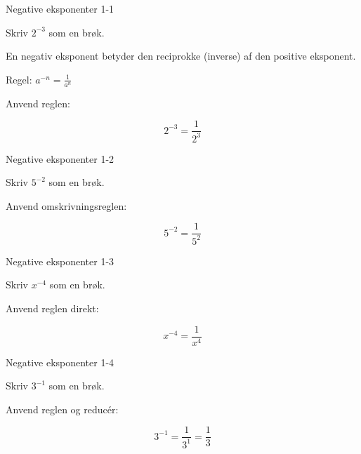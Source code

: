 \documentclass{article}
\begin{document}

\tableofcontents
\newpage

\begin{exercise}{Negative eksponenter 1-1}

Skriv $2^{-3}$ som en brøk.


\hint

En negativ eksponent betyder den reciprokke (inverse) af den positive eksponent.

\hint

Regel: $a^{-n} = \frac{1}{a^n}$

\hint

Anvend reglen:

\hint
\[
2^{-3} = \frac{1}{2^3}
\]

\end{exercise}

\newpage

\begin{exercise}{Negative eksponenter 1-2}

Skriv $5^{-2}$ som en brøk.


\hint

Anvend omskrivningsreglen:

\hint
\[
5^{-2} = \frac{1}{5^2}
\]

\end{exercise}

\newpage

\begin{exercise}{Negative eksponenter 1-3}

Skriv $x^{-4}$ som en brøk.


\hint

Anvend reglen direkt:

\hint
\[
x^{-4} = \frac{1}{x^4}
\]

\end{exercise}

\newpage

\begin{exercise}{Negative eksponenter 1-4}

Skriv $3^{-1}$ som en brøk.


\hint

Anvend reglen og reducér:

\hint
\[
3^{-1} = \frac{1}{3^1} = \frac{1}{3}
\]

\end{exercise}
\end{document}
